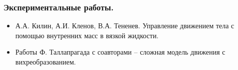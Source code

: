 \begin{frame}
\frametitle{Экспериментальные работы.}

	\begin{itemize}
		\item А.А. Килин, А.И. Кленов, В.А. Тененев. Управление движением тела с помощью внутренних масс в вязкой жидкости.
		\begin{figure}[h]
		\end{figure}
		
		\item Работы Ф. Таллапрагада с соавторами -- сложная модель движения с вихреобразованием.
		\begin{figure}[h]
		\end{figure}
		
	\end{itemize}

\end{frame}


